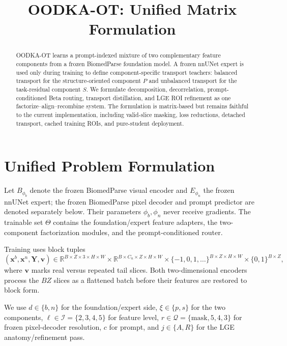\documentclass[10pt]{article}
\title{OODKA-OT: Unified Matrix Formulation}
\date{}
\newcommand{\R}{\mathbb{R}}
\newcommand{\cI}{\mathcal{I}}
\newcommand{\cQ}{\mathcal{Q}}
\begin{document}
\maketitle

\begin{abstract}
OODKA-OT learns a prompt-indexed mixture of two complementary feature
components from a frozen BiomedParse foundation model.  A frozen nnUNet expert
is used only during training to define component-specific transport teachers:
balanced transport for the structure-oriented component $P$ and unbalanced
transport for the task-residual component $S$.  We formulate decomposition,
decorrelation, prompt-conditioned Beta routing, transport distillation, and LGE
ROI refinement as one factorize--align--recombine system.  The formulation is
matrix-based but remains faithful to the current implementation, including
valid-slice masking, loss reductions, detached transport, cached training ROIs,
and pure-student deployment.
\end{abstract}

\section{Unified Problem Formulation}

Let $B_{\phi_b}$ denote the frozen BiomedParse visual encoder and
$E_{\phi_n}$ the frozen nnUNet expert; the frozen BiomedParse pixel decoder and
prompt predictor are denoted separately below.  Their parameters
$\phi_b,\phi_n$ never receive gradients.  The trainable set $\Theta$ contains
the foundation/expert feature adapters, the two-component factorization
modules, and the prompt-conditioned router.

Training uses block tuples
\begin{equation}
 (\bm x^b,\bm x^n,\bm Y,\bm v)
 \in
 \R^{B\times Z\times3\times H\times W}
 \times\R^{B\times C_n\times Z\times H\times W}
 \times\{-1,0,1,\ldots\}^{B\times Z\times H\times W}
 \times\{0,1\}^{B\times Z},
 \label{eq:block-inputs}
\end{equation}
where $\bm v$ marks real versus repeated tail slices.  Both two-dimensional
encoders process the $BZ$ slices as a flattened batch before their features are
restored to block form.

We use $d\in\{b,n\}$ for the foundation/expert side,
$\xi\in\{p,s\}$ for the two components,
$\ell\in\cI=\{2,3,4,5\}$ for feature level,
$r\in\cQ=\{\mathrm{mask},5,4,3\}$ for frozen pixel-decoder resolution,
$c$ for prompt, and $j\in\{A,R\}$ for the LGE anatomy/refinement pass.
\end{document}
